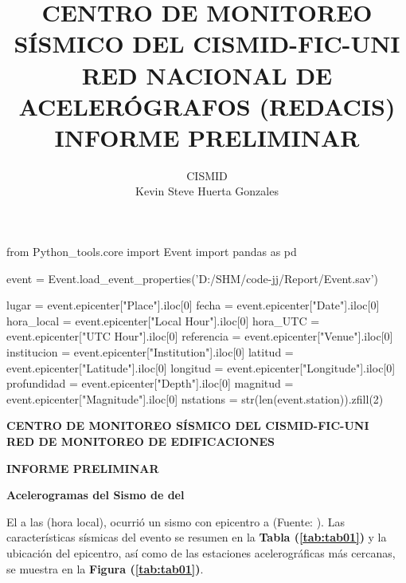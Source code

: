 \documentclass[11pt, a4paper]{report}
\author{CISMID\\Kevin Steve Huerta Gonzales}
\title{CENTRO DE MONITOREO SÍSMICO DEL CISMID-FIC-UNI \\
RED NACIONAL DE ACELERÓGRAFOS (REDACIS)\\
INFORME PRELIMINAR\\
}
\begin{document}




\begin{pycode}
from Python_tools.core import Event
import pandas as pd

event = Event.load_event_properties('D:/SHM/code-jj/Report/Event.sav')

lugar = event.epicenter["Place"].iloc[0]
fecha = event.epicenter["Date"].iloc[0]
hora_local = event.epicenter["Local Hour"].iloc[0]
hora_UTC = event.epicenter["UTC Hour"].iloc[0]
referencia = event.epicenter["Venue"].iloc[0]
institucion = event.epicenter["Institution"].iloc[0]
latitud = event.epicenter["Latitude"].iloc[0]
longitud = event.epicenter["Longitude"].iloc[0]
profundidad =  event.epicenter["Depth"].iloc[0]
magnitud = event.epicenter["Magnitude"].iloc[0]
nstations = str(len(event.station)).zfill(2)

\end{pycode}

\begin{center}
\centering 
\textbf{CENTRO DE MONITOREO SÍSMICO DEL CISMID-FIC-UNI \\
RED DE MONITOREO DE EDIFICACIONES\\}
\vspace{0.3cm}

\textbf{INFORME PRELIMINAR\\}
\vspace{0.3cm}

\textbf{Acelerogramas del Sismo de  del }
\vspace{0.25cm}
\end{center}

El  a las  (hora local), ocurrió un sismo con epicentro a  (Fuente: ). Las características sísmicas del evento 
se resumen en la \textbf{Tabla (\ref{tab:tab01})} y la ubicación del epicentro, así como de las estaciones 
acelerográficas más cercanas, se muestra en la \textbf{Figura (\ref{tab:tab01})}. \\
\end{document}
